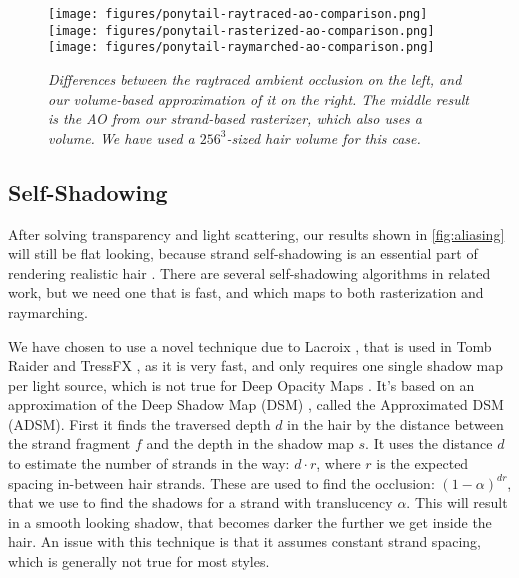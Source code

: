 \documentclass{egpubl}
\begin{document}
\begin{figure}[htb]
    \centering
    \texttt{[image: figures/ponytail-raytraced-ao-comparison.png]}
    \texttt{[image: figures/ponytail-rasterized-ao-comparison.png]}
    \texttt{[image: figures/ponytail-raymarched-ao-comparison.png]}
    \caption{\emph{Differences between the raytraced ambient occlusion on the left, and our volume-based approximation of it on the right. The middle result is the AO from our strand-based rasterizer, which also uses a volume. We have used a $256^3$-sized hair volume for this case.}}
    \label{fig:ambient_occlusion}
    \vspace{-6mm}
\end{figure}


\subsection{Self-Shadowing} \label{sec:self-shadowing}


After solving transparency and light scattering, our results shown in \cref{fig:aliasing} will still be flat looking, because strand self-shadowing is an essential part of rendering realistic hair \cite{ward2007survey}. There are several self-shadowing algorithms in related work, but we need one that is fast, and which maps to both rasterization and raymarching.

We have chosen to use a novel technique due to Lacroix \cite{lacroix2013tressfx}, that is used in Tomb Raider and TressFX \cite{martin2014tressfx, steward2015augmented}, as it is very fast, and only requires one single shadow map per light source, which is not true for Deep Opacity Maps \cite{yuksel2008deep}. It's based on an approximation of the Deep Shadow Map (DSM) \cite{lokovic2000deep}, called the Approximated DSM (ADSM). First it finds the traversed depth $d$ in the hair by the distance between the strand fragment $f$ and the depth in the shadow map $s$. It uses the distance $d$ to estimate the number of strands in the way: $d \cdot r$, where $r$ is the expected spacing in-between hair strands. These are used to find the occlusion: $(1 - \alpha)^{dr}$, that we use to find the shadows for a strand with translucency $\alpha$. This will result in a smooth looking shadow, that becomes darker the further we get inside the hair. An issue with this technique is that it assumes constant strand spacing, which is generally not true for most styles.
\end{document}
